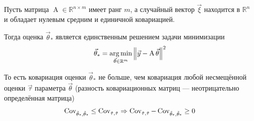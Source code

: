\begin{theorem}
  \label{theorem:gaussMarkov}
  Пусть матрица $\operatorname{A} \in \mathbb{R}^{n \times m}$ имеет ранг $m$,
  а случайный вектор $\vec{\xi}$ находится в $\mathbb{R}^n$ и обладает нулевым
  средним и единичной ковариацией.

  Тогда оценка $\vec{\theta}_*$ является единственным решением задачи
  минимизации
  \begin{align*}
      \vec{\theta}_*
      = \argminof{\left\| \vec{y} - \operatorname{A} \vec{\theta} \right\|^2}{
      \vec{\theta} \in \mathbb{R}^m}
  \end{align*}

  То есть ковариация оценки $\vec{\theta}_*$ не больше, чем ковариация любой
  несмещённой оценки $\vec{\tau}$ параметра $\vec{\theta}$ (разность
  ковариационных матриц --- неотрицательно определённая матрица)
  \begin{align*}
      \dCov{\vec{\theta}_*} \le \dCov{\vec{\tau}}
      \Rightarrow \dCov{\vec{\tau}} - \dCov{\vec{\theta}_*} \ge 0
  \end{align*}
\end{theorem}
